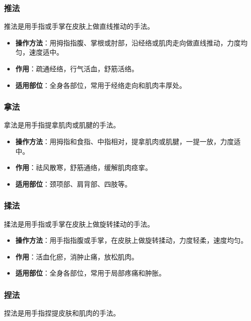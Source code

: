 \documentclass[12pt,UTF8]{ctexbook}
\begin{document}
\subsubsection{推法}

推法是用手指或手掌在皮肤上做直线推动的手法。

\begin{itemize}
\item \textbf{操作方法}：用拇指指腹、掌根或肘部，沿经络或肌肉走向做直线推动，力度均匀，速度适中。
\item \textbf{作用}：疏通经络，行气活血，舒筋活络。
\item \textbf{适用部位}：全身各部位，常用于经络走向和肌肉丰厚处。
\end{itemize}

\subsubsection{拿法}

拿法是用手指提拿肌肉或肌腱的手法。

\begin{itemize}
\item \textbf{操作方法}：用拇指和食指、中指相对，提拿肌肉或肌腱，一提一放，力度适中。
\item \textbf{作用}：祛风散寒，舒筋通络，缓解肌肉痉挛。
\item \textbf{适用部位}：颈项部、肩背部、四肢等。
\end{itemize}

\subsubsection{揉法}

揉法是用手指或手掌在皮肤上做旋转揉动的手法。

\begin{itemize}
\item \textbf{操作方法}：用手指指腹或手掌，在皮肤上做旋转揉动，力度轻柔，速度均匀。
\item \textbf{作用}：活血化瘀，消肿止痛，放松肌肉。
\item \textbf{适用部位}：全身各部位，常用于局部疼痛和肿胀。
\end{itemize}

\subsubsection{捏法}

捏法是用手指捏提皮肤和肌肉的手法。
\end{document}
